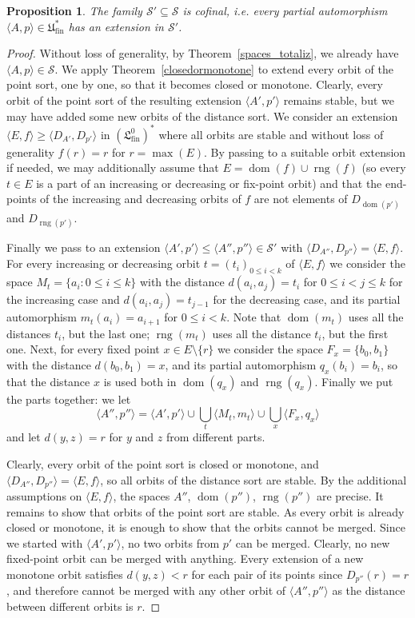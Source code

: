 \documentclass[oneside,notitlepage,12pt]{article}
\newtheorem{prop}[tw]{Proposition}
\theoremstyle{definition}
\theoremstyle{remark}
\newcommand \set [1]{\{#1\}}
\newcommand \seq [1]{\langle #1 \rangle}
\newcommand \dom {\operatorname{dom}}
\newcommand \rng {\operatorname{rng}}
\newcommand \Su {\mathscr{S}}
\newcommand \fin {{\operatorname{fin}}}
\newcommand \Lin {\mathfrak{L}}
\newcommand \Ult {\mathfrak{U}}
\begin{document}
\begin{prop} \label{thm:sufficient_cofinal}
    The family $\Su' \subseteq \Su$ is cofinal, i.e. every partial automorphism $\seq{A, p} \in \Ult^*_\fin$ has an extension in $\Su'$.
\end{prop}
\begin{proof}
    Without loss of generality, by Theorem~\ref{spaces_totaliz}, we already have $\seq{A, p} \in \Su$.
    We apply Theorem~\ref{closedormonotone} to extend every orbit of the point sort, one by one, so that it becomes closed or monotone.
    Clearly, every orbit of the point sort of the resulting extension $\seq{A', p'}$ remains stable, but we may have added some new orbits of the distance sort.
    We consider an extension $\seq{E, f} \geq \seq{D_{A'}, D_{p'}}$ in $(\Lin^0_\fin)^*$ where all orbits are stable and without loss of generality $f(r) = r$ for $r = \max(E)$.
    By passing to a suitable orbit extension if needed, we may additionally assume that $E = \dom(f) \cup \rng(f)$ (so every $t \in E$ is a part of an increasing or decreasing or fix-point orbit) and that the end-points of the increasing and decreasing orbits of $f$ are not elements of $D_{\dom(p')}$ and $D_{\rng(p')}$.

    Finally we pass to an extension $\seq{A', p'} \leq \seq{A'', p''} \in \Su'$ with $\seq{D_{A''}, D_{p''}} = \seq{E, f}$.
    For every increasing or decreasing orbit $t = (t_i)_{0 \leq i < k}$ of $\seq{E, f}$ we consider the space $M_t = \set{a_i: 0 \leq i \leq k}$ with the distance $d(a_i, a_j) = t_i$ for $0 \leq i < j \leq k$ for the increasing case and $d(a_i, a_j) = t_{j - 1}$ for the decreasing case, and its partial automorphism $m_t(a_i) = a_{i + 1}$ for $0 \leq i < k$.
    Note that $\dom(m_t)$ uses all the distances $t_i$, but the last one; $\rng(m_t)$ uses all the distance $t_i$, but the first one.
    Next, for every fixed point $x \in E \setminus \set{r}$ we consider the space $F_x = \set{b_0, b_1}$ with the distance $d(b_0, b_1) = x$, and its partial automorphism $q_x(b_i) = b_i$, so that the distance $x$ is used both in $\dom(q_x)$ and $\rng(q_x)$.
    Finally we put the parts together: we let 
    \[\textstyle
        \seq{A'', p''} = \seq{A', p'} \cup \bigcup_t \seq{M_t, m_t} \cup \bigcup_x \seq{F_x, q_x}
    \]
    and let $d(y, z) = r$ for $y$ and $z$  from different parts.

    Clearly, every orbit of the point sort is closed or monotone, and $\seq{D_{A''}, D_{p''}} = \seq{E, f}$, so all orbits of the distance sort are stable.
    By the additional assumptions on $\seq{E, f}$, the spaces $A''$, $\dom(p'')$, $\rng(p'')$ are precise.
    It remains to show that orbits of the point sort are stable.
    As every orbit is already closed or monotone, it is enough to show that the orbits cannot be merged.
    Since we started with $\seq{A', p'}$, no two orbits from $p'$ can be merged.
    Clearly, no new fixed-point orbit can be merged with anything.
    Every extension of a new monotone orbit satisfies $d(y, z) < r$ for each pair of its points since $D_{p''}(r) = r$, and therefore cannot be merged with any other orbit of $\seq{A'', p''}$ as the distance between different orbits is $r$.
\end{proof}
\end{document}
